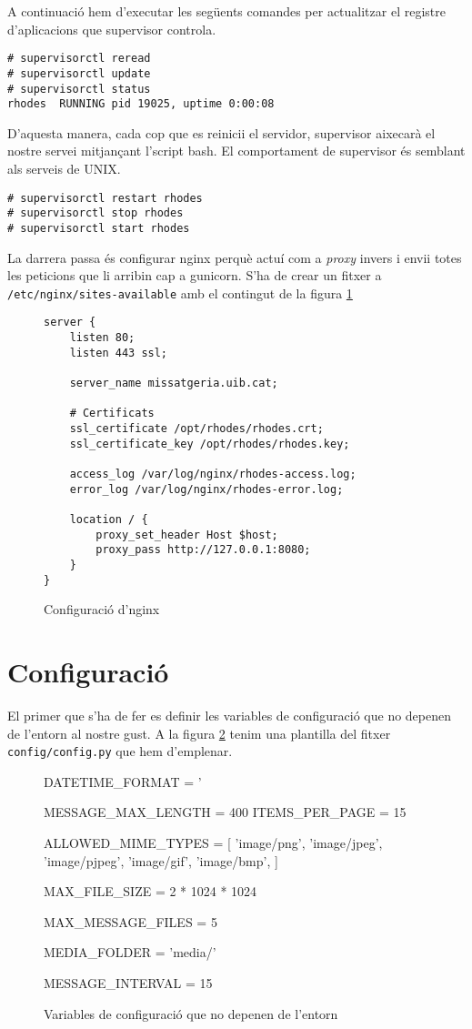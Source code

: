 A continuació hem d'executar les següents comandes per actualitzar el registre d'aplicacions que supervisor controla.
\begin{verbatim}
# supervisorctl reread
# supervisorctl update
# supervisorctl status
rhodes	RUNNING	pid 19025, uptime 0:00:08
\end{verbatim}

D'aquesta manera, cada cop que es reinicii el servidor, supervisor aixecarà el nostre servei mitjançant l'script bash. El comportament de supervisor és semblant als serveis de UNIX.

\begin{verbatim}
# supervisorctl restart rhodes
# supervisorctl stop rhodes
# supervisorctl start rhodes
\end{verbatim}

La darrera passa és configurar nginx perquè actuí com a \emph{proxy} invers i envii totes les peticions que li arribin cap a gunicorn. S'ha de crear un fitxer a \texttt{/etc/nginx/sites-available} amb el contingut de la figura \ref{fig:nginx}

\begin{figure}[h!]
	\begin{verbatim}
server {
    listen 80;
    listen 443 ssl;
	
    server_name missatgeria.uib.cat;

    # Certificats
    ssl_certificate /opt/rhodes/rhodes.crt;
    ssl_certificate_key /opt/rhodes/rhodes.key;
    
    access_log /var/log/nginx/rhodes-access.log;
    error_log /var/log/nginx/rhodes-error.log;

    location / {
        proxy_set_header Host $host;
        proxy_pass http://127.0.0.1:8080;
    }
}
	\end{verbatim}
	\caption{Configuració d'nginx}
	\label{fig:nginx}
\end{figure}
\section{Configuració}
El primer que s'ha de fer es definir les variables de configuració que no depenen de l'entorn al nostre gust. A la figura \ref{fig:variables_no_entorn} tenim una plantilla del fitxer \texttt{config/config.py} que hem d'emplenar.

\begin{figure}[h!]
	\begin{python}
	
DATETIME_FORMAT = '%

MESSAGE_MAX_LENGTH = 400
ITEMS_PER_PAGE = 15

ALLOWED_MIME_TYPES = [
    'image/png',
    'image/jpeg',
    'image/pjpeg',
    'image/gif',
    'image/bmp',
]

MAX_FILE_SIZE = 2 * 1024 * 1024

MAX_MESSAGE_FILES = 5

MEDIA_FOLDER = 'media/'

MESSAGE_INTERVAL = 15
	\end{python}
	\caption{Variables de configuració que no depenen de l'entorn}
	\label{fig:variables_no_entorn}
\end{figure}

